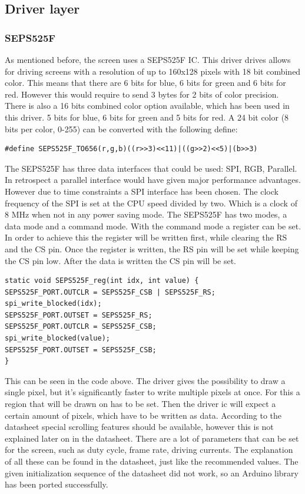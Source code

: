 \subsection{Driver layer}
\subsubsection{SEPS525F}
As mentioned before, the screen uses a SEPS525F IC. This driver drives allows for driving screens with a resolution of up to 160x128 pixels with 18 bit combined color. This means that there are 6 bits for blue, 6 bits for green and 6 bits for red. However this would require to send 3 bytes for 2 bits of color precision. There is also a 16 bits combined color option available, which has been used in this driver. 5 bits for blue, 6 bits for green and 5 bits for red. A 24 bit color (8 bits per color, 0-255) can be converted with the following define:
\begin{verbatim}
#define SEPS525F_TO656(r,g,b)((r>>3)<<11)|((g>>2)<<5)|(b>>3)
\end{verbatim}
The SEPS525F has three data interfaces that could be used: SPI, RGB, Parallel. In retrospect a parallel interface would have given major performance advantages. However due to time constraints a SPI interface has been chosen. The clock frequency of the SPI is set at the CPU speed divided by two. Which is a clock of 8 MHz when not in any power saving mode.\newpar
The SEPS525F has two modes, a data mode and a command mode. With the command mode a register can be set. In order to achieve this the register will be written first, while clearing the RS and the CS pin. Once the register is written, the RS pin will be set while keeping the CS pin low. After the data is written the CS pin will be set.
\begin{verbatim}
static void SEPS525F_reg(int idx, int value) {
SEPS525F_PORT.OUTCLR = SEPS525F_CSB | SEPS525F_RS;
spi_write_blocked(idx);
SEPS525F_PORT.OUTSET = SEPS525F_RS;
SEPS525F_PORT.OUTCLR = SEPS525F_CSB;
spi_write_blocked(value);
SEPS525F_PORT.OUTSET = SEPS525F_CSB;
}
\end{verbatim}
This can be seen in the code above. The driver gives the possibility to draw a single pixel, but it's significantly faster to write multiple pixels at once. For this a region that will be drawn on has to be set. Then the driver ic will expect a certain amount of pixels, which have to be written as data. According to the datasheet special scrolling features should be available, however this is not explained later on in the datasheet. There are a lot of parameters that can be set for the screen, such as duty cycle, frame rate, driving currents. The explanation of all these can be found in the datasheet, just like the recommended values. The given initialization sequence of the datasheet did not work, so an Arduino library has been ported successfully\cite{github:oled}.
